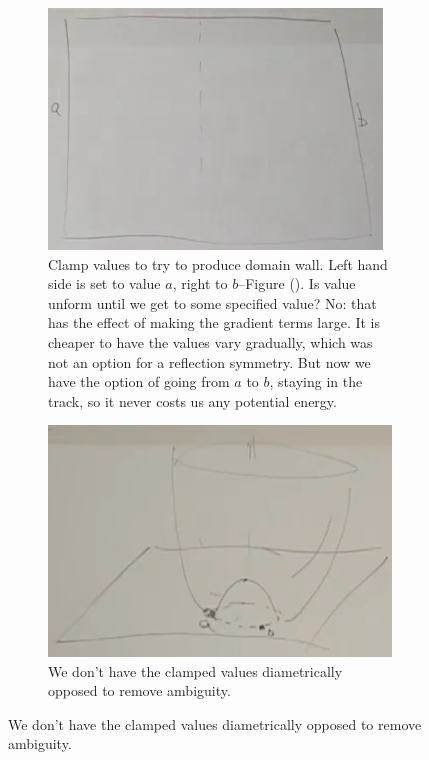 \documentclass[]{article}
\begin{document}
\begin{figure}[H]
\begin{subfigure}[t]{0.45\textwidth}
	\end{subfigure}
	\begin{subfigure}[t]{0.45\textwidth}
		\caption{Clamp values to try to produce domain wall. Left hand side is set to value $a$, right to $b$--Figure (). Is value unform until we get to some specified value? No: that has the effect of making the gradient terms large. It is cheaper to have the values vary gradually, which was not an option for a reflection symmetry. But now we have the option of going from $a$ to $b$, staying in the track, so it never costs us any potential energy.}\label{fig:2-7-V-quartic-domain-wall-ab}
		\includegraphics[width=\textwidth]{2-7-V-quartic-domain-wall-ab}
	\end{subfigure}
	\hfill
	\begin{subfigure}[t]{0.45\textwidth}
		\caption{We don't have the clamped values diametrically opposed to remove ambiguity.}\label{fig:2-7-V-quartic-domain-wall}
		\includegraphics[width=\textwidth]{2-7-V-quartic-domain-wall}
	\end{subfigure}
\end{figure}
\end{document}
